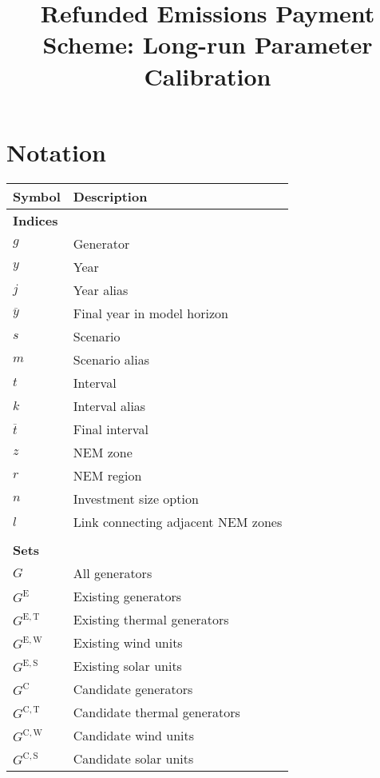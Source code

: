 \documentclass{article}
\title{Refunded Emissions Payment Scheme: Long-run Parameter Calibration}
\newcommand{\sGenerators}{G}
\newcommand{\sGeneratorsExisting}{G^{\mathrm{E}}}
\newcommand{\sGeneratorsExistingThermal}{G^{\mathrm{E,T}}}
\newcommand{\sGeneratorsExistingWind}{G^{\mathrm{E,W}}}
\newcommand{\sGeneratorsExistingSolar}{G^{\mathrm{E,S}}}
\newcommand{\sGeneratorsCandidate}{G^{\mathrm{C}}}
\newcommand{\sGeneratorsCandidateThermal}{G^{\mathrm{C,T}}}
\newcommand{\sGeneratorsCandidateWind}{G^{\mathrm{C,W}}}
\newcommand{\sGeneratorsCandidateSolar}{G^{\mathrm{C,S}}}
\newcommand{\iGenerator}{g}
\newcommand{\iYear}{y}
\newcommand{\iYearTerminal}{\overline{\iYear}}
\newcommand{\iYearAlias}{j}
\newcommand{\iScenario}{s}
\newcommand{\iScenarioAlias}{m}
\newcommand{\iInterval}{t}
\newcommand{\iIntervalAlias}{k}
\newcommand{\iIntervalTerminal}{\overline{\iInterval}}
\newcommand{\iZone}{z}
\newcommand{\iRegion}{r}
\newcommand{\iInvestmentSizeOption}{n}
\newcommand{\iLink}{l}
\begin{document}
	\maketitle
	

\section{Notation}
\renewcommand*{\arraystretch}{1.3}
\begin{longtable}{ p{}  p{}}
	\textbf{Symbol} & \textbf{Description}\\
	\hline\hline
	\multicolumn{2}{l}{\textbf{Indices}}\\
	$\iGenerator$ & Generator\\ 
	$\iYear$ & Year\\
	$\iYearAlias$ & Year alias\\
	$\iYearTerminal$ & Final year in model horizon\\
	$\iScenario$ & Scenario\\
	$\iScenarioAlias$ & Scenario alias\\
	$\iInterval$ & Interval\\
	$\iIntervalAlias$ & Interval alias\\
	$\iIntervalTerminal$ & Final interval\\
	$\iZone$ & NEM zone\\
	$\iRegion$ & NEM region\\
	$\iInvestmentSizeOption$ & Investment size option\\
	$\iLink$ & Link connecting adjacent NEM zones\\
	& \\
	\multicolumn{2}{l}{\textbf{Sets}}\\
	$\sGenerators$ & All generators\\
	$\sGeneratorsExisting$ & Existing generators\\
	$\sGeneratorsExistingThermal$ & Existing thermal generators\\
	$\sGeneratorsExistingWind$ & Existing wind units\\
	$\sGeneratorsExistingSolar$ & Existing solar units\\
	$\sGeneratorsCandidate$ & Candidate generators\\
	$\sGeneratorsCandidateThermal$ & Candidate thermal generators\\
	$\sGeneratorsCandidateWind$ & Candidate wind units\\
	$\sGeneratorsCandidateSolar$ & Candidate solar units\\

\end{longtable}
\end{document}
